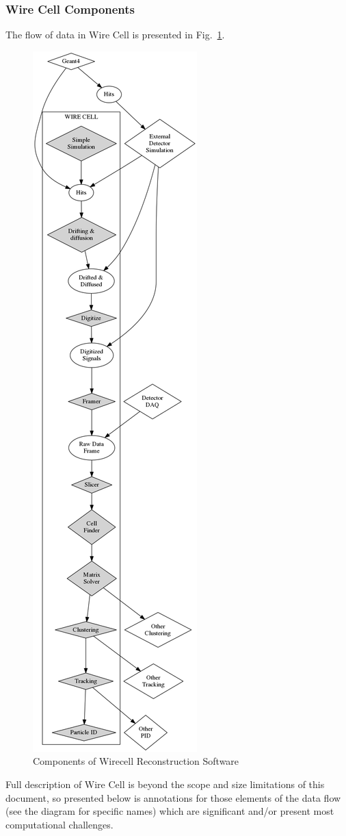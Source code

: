 \subsubsection{Wire Cell Components}
The flow of data in Wire Cell is presented in Fig.~\ref{fig:wirecell-diagram}.
\begin{figure}[h!]
	\centering
	\includegraphics[height=0.8\textheight]{wirecell-dataflow-conceptual.png}
	\caption{Components of Wirecell Reconstruction Software}
	\label{fig:wirecell-diagram}
\end{figure}
Full description of Wire Cell is  beyond the scope and size limitations of this document,
so presented below is annotations for those elements of the data flow (see the diagram for specific
names) which are significant and/or present most computational challenges.

